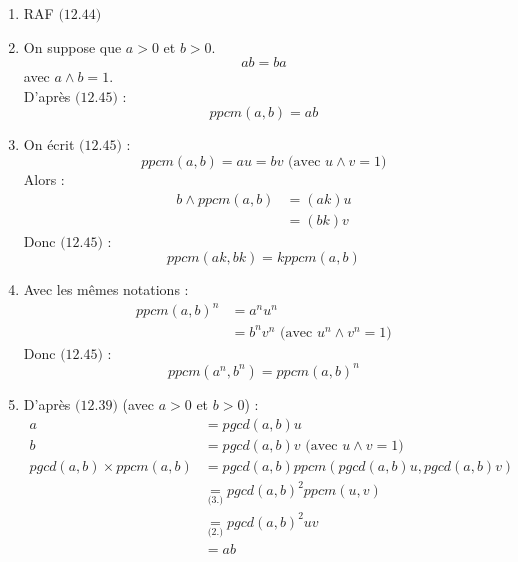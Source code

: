 \documentclass[../main.tex]{subfiles}
\begin{document}
\begin{enumerate}
    \item RAF $\text{(12.44)}$
    \item On suppose que $a >0$ et $b > 0$. \\
    $$ab =ba$$
    avec $a \wedge b = 1$. \\
    D'après $\text{(12.45)}$ :
    $$ppcm(a,b) = ab$$

    \item On écrit $\text{(12.45)}$ :
    $$ppcm(a,b) = au = bv \text{ (avec $u \wedge v = 1$)}$$
    Alors : 
    \begin{align*}
        b \wedge ppcm(a,b) &= (ak)u \\
        &= (bk)v
    \end{align*}
    Donc $\text{(12.45)}$ :
    $$ppcm(ak, bk) = kppcm(a,b)$$

    \setcounter{enumi}{4}
    \item Avec les mêmes notations : 
    \begin{align*}
        ppcm(a, b)^n &= a^n u^n \\
        &= b^n v^n \text{ (avec $u^n \wedge v^n = 1$)}
    \end{align*}
    Donc $\text{(12.45)}$ :
    $$ppcm(a^n, b^n) = ppcm(a,b)^n$$
    
    \setcounter{enumi}{3}
    \item D'après $\text{(12.39)}$ (avec $a > 0$ et $b > 0$) :
    \begin{align*}
        a &= pgcd(a,b)u \\
        b &= pgcd(a,b)v \text{ (avec $u \wedge v = 1$)} \\
        pgcd(a, b) \times ppcm(a, b) &= pgcd(a, b) ppcm(pgcd(a, b)u, pgcd(a, b)v) \\
        &\underset{\text{(3.)}}{=} pgcd(a, b)^2 ppcm(u, v) \\
        &\underset{\text{(2.)}}{=} pgcd(a, b)^2uv \\
        &= ab
    \end{align*}
\end{enumerate}

\setcounter{section}{49}
\end{document}
